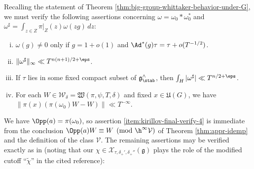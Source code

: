 Recalling the statement of Theorem \ref{thm:big-group-whittaker-behavior-under-G}, we must verify the following assertions concerning $\omega = \omega_0 \ast \omega_0^*$ and $\omega^\sharp = \int_{z \in Z} \pi|_Z (z) \omega(z g) \, d z$:
\begin{enumerate}[(i)]
\item \label{item:kirillov-final-verify-1} $\omega(g) \neq 0$ only if $g = 1 + o(1)$ and $\Ad^*(g) \tau = \tau + o(T^{-1/2})$.
\item \label{item:kirillov-final-verify-2} $\|\omega^\sharp\|_{\infty} \ll T^{n(n+1)/2+\eps}$.
\item \label{item:kirillov-final-verify-3} If $\tau$ lies in some fixed compact subset of $\mathfrak{g}^\wedge_{\stab}$, then $\int_H |\omega^\sharp| \ll T^{n/2 + \eps}$.
\item \label{item:kirillov-final-verify-4} For each $W \in \mathcal{W}_\delta = \mathfrak{W}(\pi,\psi,T,\delta)$ and fixed $x \in \mathfrak{U}(G)$, we have $\|\pi(x) (\pi(\omega_0)W - W)\| \ll T^{-\infty}$.
\end{enumerate}
We have $\Opp(a) = \pi(\omega_0)$, so assertion \eqref{item:kirillov-final-verify-4} is immediate from the conclusion $\Opp(a) W \equiv W \pmod{\h^\infty \mathcal{V}}$ of Theorem \ref{thm:appr-idemp} and the definition of the class $\mathcal{V}$.  The remaining assertions may be verified exactly as in \cite[\S14.9]{2020arXiv201202187N} (noting that our $\chi \in \mathcal{X}_{\tau, \delta_+', \delta_+''}(\mathfrak{g})$ plays the role of the modified cutoff ``$\tilde{\chi}$'' in the cited reference):
